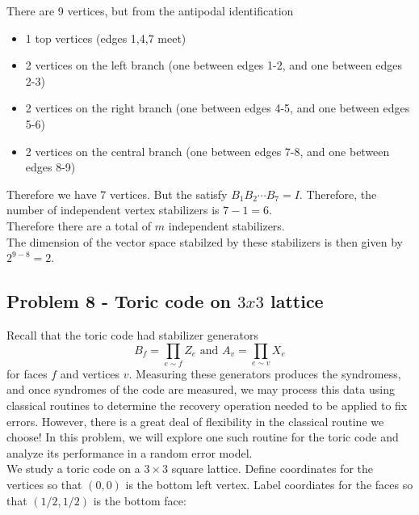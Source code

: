 There are 9 vertices, but from the  antipodal identification
\begin{itemize}
    \item 1 top vertices (edges 1,4,7 meet)
    \item 2 vertices on the left branch (one between edges 1-2, and one between edges 2-3)
    \item 2 vertices on the right branch (one between edges 4-5, and one between edges 5-6)
    \item 2 vertices on the central branch (one between edges 7-8, and one between edges 8-9)
\end{itemize}
Therefore we have 7 vertices. But the satisfy $B_1 B_2\cdots B_7 = I$. Therefore, the number of independent vertex stabilizers is $7-1=6$. \\

Therefore there are a total of $m$ independent stabilizers. \\

The dimension of the vector space stabilzed by these stabilizers is then given by $2^{9-8} = 2$. 


\newpage
\subsection{Problem 8 - Toric code on $3x3$ lattice}
Recall that the toric code had stabilizer generators
\begin{equation}
    B_f = \prod_{e\sim f} Z_e \text{ and } A_v = \prod_{e\sim v} X_e
\end{equation}
for faces $f$ and vertices $v$. Measuring these generators produces the syndromess, and once syndromes of the code are measured, we may process this data using classical routines to determine the recovery operation needed to be applied to fix errors. However, there is a great deal of flexibility in the classical routine we choose! In this problem, we will explore one such routine for the toric code and analyze its performance in a random error model. \\

We study a toric code on a $3\times 3$ square lattice. Define coordinates for the vertices so that $(0,0)$ is the bottom left vertex. Label coordiates for the faces so that $(1/2, 1/2)$ is the bottom face: 

